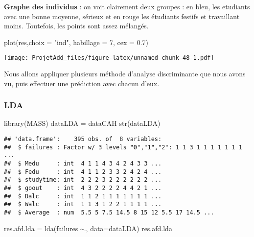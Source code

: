 \documentclass[
]{article}
\newenvironment{Shaded}{\begin{snugshade}}{\end{snugshade}}
\newcommand{\AttributeTok}[1]{\textcolor[rgb]{0.77,0.63,0.00}{#1}}
\newcommand{\DecValTok}[1]{\textcolor[rgb]{0.00,0.00,0.81}{#1}}
\newcommand{\FloatTok}[1]{\textcolor[rgb]{0.00,0.00,0.81}{#1}}
\newcommand{\FunctionTok}[1]{\textcolor[rgb]{0.00,0.00,0.00}{#1}}
\newcommand{\NormalTok}[1]{#1}
\newcommand{\OtherTok}[1]{\textcolor[rgb]{0.56,0.35,0.01}{#1}}
\newcommand{\SpecialCharTok}[1]{\textcolor[rgb]{0.00,0.00,0.00}{#1}}
\newcommand{\StringTok}[1]{\textcolor[rgb]{0.31,0.60,0.02}{#1}}
\begin{document}
\textbf{Graphe des individus} : on voit clairement deux groupes : en
bleu, les etudiants avec une bonne moyenne, sérieux et en rouge les
étudiants festifs et travaillant moins. Toutefois, les points sont assez
mélangés.

\begin{Shaded}
\begin{Highlighting}[]
\FunctionTok{plot}\NormalTok{(res,}\AttributeTok{choix =} \StringTok{"ind"}\NormalTok{, }\AttributeTok{habillage =} \DecValTok{7}\NormalTok{, }\AttributeTok{cex =} \FloatTok{0.7}\NormalTok{)}
\end{Highlighting}
\end{Shaded}

\texttt{[image: ProjetAdd\_files/figure-latex/unnamed-chunk-48-1.pdf]}

Nous allons appliquer plusieurs méthode d'analyse discriminante que nous
avons vu, puis effectuer une prédiction avec chacun d'eux.

\hypertarget{lda}{%
\subsubsection{LDA}\label{lda}}

\begin{Shaded}
\begin{Highlighting}[]
\FunctionTok{library}\NormalTok{(MASS)}
\NormalTok{dataLDA }\OtherTok{=}\NormalTok{ dataCAH}
\FunctionTok{str}\NormalTok{(dataLDA)}
\end{Highlighting}
\end{Shaded}

\begin{verbatim}
## 'data.frame':    395 obs. of  8 variables:
##  $ failures : Factor w/ 3 levels "0","1","2": 1 1 3 1 1 1 1 1 1 1 ...
##  $ Medu     : int  4 1 1 4 3 4 2 4 3 3 ...
##  $ Fedu     : int  4 1 1 2 3 3 2 4 2 4 ...
##  $ studytime: int  2 2 2 3 2 2 2 2 2 2 ...
##  $ goout    : int  4 3 2 2 2 2 4 4 2 1 ...
##  $ Dalc     : int  1 1 2 1 1 1 1 1 1 1 ...
##  $ Walc     : int  1 1 3 1 2 2 1 1 1 1 ...
##  $ Average  : num  5.5 5 7.5 14.5 8 15 12 5.5 17 14.5 ...
\end{verbatim}

\begin{Shaded}
\begin{Highlighting}[]
\NormalTok{res.afd.lda }\OtherTok{=} \FunctionTok{lda}\NormalTok{(failures }\SpecialCharTok{\textasciitilde{}}\NormalTok{., }\AttributeTok{data=}\NormalTok{dataLDA)}
\NormalTok{res.afd.lda}
\end{Highlighting}
\end{Shaded}
\end{document}
